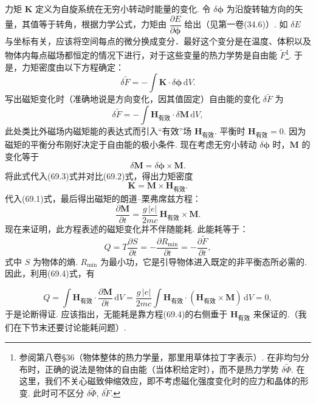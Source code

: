 力矩 $\bm{K}$ 定义为自旋系统在无穷小转动时能量的变化. 令 $\delta\bm{\phi}$ 为沿旋转轴方向的矢量，其值等于转角，根据力学公式，力矩由 $\dfrac{\partial E}{\partial\bm{\phi}}$ 给出（见第一卷(34.6)）. 如 $\delta E$ 与坐标有关，应该将空间每点的微分换成变分．最好这个变分是在温度、体积以及物体内每点磁场都恒定的情况下进行，对于这些变量的热力学势是自由能 $\tilde{F}$\footnote{参阅第八卷§36（物体整体的热力学量，那里用草体拉丁字表示）. 在非均匀分布时，正确的说法是物体的自由能（当体积给定时），而不是热力学势 $\delta\tilde{\varPhi}$. 在这里，我们不关心磁致伸缩效应，即不考虑磁化强度变化时的应力和晶体的形变. 此时可不区分 $\delta\tilde{\varPhi}$, $\delta\tilde{F}$.}. 于是，力矩密度由以下方程确定：
\begin{equation}
\delta\tilde{F}=-\int\bm{K}\cdot\delta\bm{\phi}\,\mathrm{d}V.
\end{equation}
写出磁矩变化时（准确地说是方向变化，因其值固定）自由能的变化 $\delta\tilde{F}$ 为
\begin{equation}
\delta\tilde{F}=-\int\bm{H}_{\text{有效}}\cdot\delta\bm{M}\,\mathrm{d}V,
\end{equation}
此处类比外磁场内磁矩能的表达式而引入“有效”场 $\bm{H}_{\text{有效}}$. 平衡时 $\bm{H}_{\text{有效}}=0$. 因为磁矩的平衡分布刚好决定于自由能的极小条件. 现在考虑无穷小转动 $\delta\bm{\phi}$ 时，$\bm{M}$ 的变化等于
\begin{equation*}
\delta\bm{M}=\delta\bm{\phi}\times\bm{M}.
\end{equation*}
将此式代入(69.3)式并对比(69.2)式，得出力矩密度
\begin{equation*}
\bm{K}=\bm{M}\times\bm{H}_{\text{有效}}.
\end{equation*}
代入(69.1)式，最后得出磁矩的朗道–栗弗席兹方程：
\begin{equation}
\frac{\partial\bm{M}}{\partial t}=\frac{g\,|e|}{2mc}\,\bm{H}_{\text{有效}}\times\bm{M}.
\end{equation}
现在来证明，此方程表述的磁矩变化并不伴随能耗. 此能耗等于：
\begin{equation*}
Q=T\frac{\partial S}{\partial t}=-\frac{\partial R_{\min}}{\partial t}=-\frac{\partial\tilde{F}}{\partial t},
\end{equation*}
式中 $S$ 为物体的熵. $R_{\min}$ 为最小功，它是引导物体进入既定的非平衡态所必需的. 因此，利用(69.4)式，有

\begin{equation*}
Q=\int\bm{H}_{\text{有效}}\cdot\frac{\partial\bm{M}}{\partial t}\,\mathrm{d}V
=\frac{g\,|e|}{2mc}\int\bm{H}_{\text{有效}}\cdot
(\bm{H}_{\text{有效}}\times\bm{M})\,\mathrm{d}V=0,
\end{equation*}
于是论断得证. 应该指出，无能耗是靠方程(69.4)的右侧垂于 $\bm{H}_{\text{有效}}$ 来保证的.（我们在下节末还要讨论能耗问题）.

